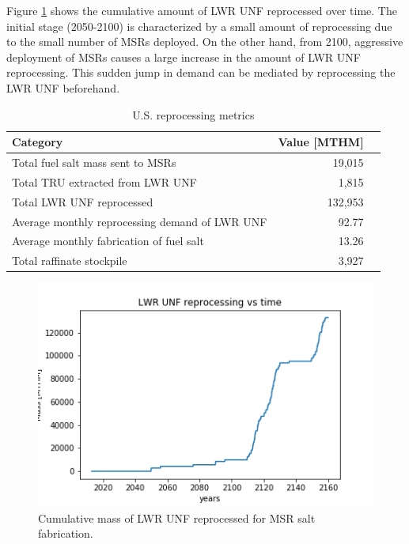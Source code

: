 Figure \ref{fig:lwr_unf_reproc} shows the cumulative amount of \gls{LWR}
\gls{UNF} reprocessed over time. The initial stage (2050-2100) is characterized
by a small amount of reprocessing due to the small number of \glspl{MSR} deployed.
On the other hand, from 2100, aggressive deployment of \glspl{MSR} causes
a large increase in the amount of \gls{LWR} \gls{UNF} reprocessing. This sudden
jump in demand can be mediated by reprocessing the \gls{LWR} \gls{UNF} beforehand.

\begin{table}[h]
	\centering
	\caption{U.S. reprocessing metrics}
	\begin{tabular}{lrl}
		\hline
		\textbf{Category} & \textbf{Value [MTHM]} \\
		\hline
		Total fuel salt mass sent to \gls{MSR}s & 19,015 \\
		Total TRU extracted from \gls{LWR} \gls{UNF} & 1,815 \\
		Total \gls{LWR} \gls{UNF} reprocessed & 132,953 \\
		Average monthly reprocessing demand of \gls{LWR} \gls{UNF} & 92.77 \\
		Average monthly fabrication of fuel salt & 13.26 \\
		Total raffinate stockpile & 3,927 \\
		\hline
	\end{tabular}
	\label{tab:us_rep}
\end{table}


\begin{figure}[htbp!]
	\begin{center}
		\includegraphics[scale=0.6]{./images/us/lwr_unf_reproc.png}
	\end{center}
	\caption{Cumulative mass of \gls{LWR} \gls{UNF} reprocessed for \gls{MSR}
			salt fabrication.}
	\label{fig:lwr_unf_reproc}
\end{figure}

